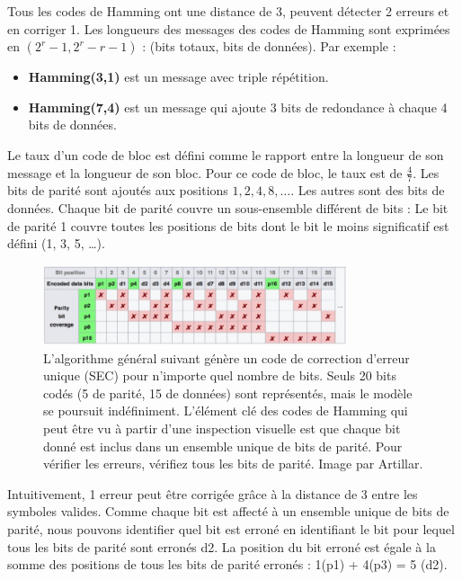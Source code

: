 Tous les codes de Hamming ont une distance de 3, peuvent détecter 2 erreurs et en corriger 1.  
Les longueurs des messages des codes de Hamming sont exprimées en $(2^r -1 , 2^r - r - 1)$ : (bits totaux, bits de données). Par exemple :
\begin{itemize}
    \item \textbf{Hamming(3,1)} est un message avec triple répétition.
    \item \textbf{Hamming(7,4)} est un message qui ajoute 3 bits de redondance à chaque 4 bits de données.
\end{itemize}
Le taux d'un code de bloc est défini comme le rapport entre la longueur de son message et la longueur de son bloc.  
Pour ce code de bloc, le taux est de $ \frac{4}{7} $.
Les bits de parité sont ajoutés aux positions $ 1, 2, 4, 8, \dots $. Les autres sont des bits de données.  
Chaque bit de parité couvre un sous-ensemble différent de bits :  
Le bit de parité 1 couvre toutes les positions de bits dont le bit le moins significatif est défini (1, 3, 5, …).
\begin{figure}[H] %
    \centering
    \includegraphics[width=0.8\textwidth]{figures/6-27.jpg}
    \caption{L'algorithme général suivant génère un code de correction d'erreur unique (SEC) pour n'importe quel nombre de bits. Seuls 20 bits codés (5 de parité, 15 de données) sont représentés, mais le modèle se poursuit indéfiniment. L'élément clé des codes de Hamming qui peut être vu à partir d'une inspection visuelle est que chaque bit donné est inclus dans un ensemble unique de bits de parité. Pour vérifier les erreurs, vérifiez tous les bits de parité. Image par Artillar. }
    \label{fig:communication2}
\end{figure}
Intuitivement, 1 erreur peut être corrigée grâce à la distance de 3 entre les symboles valides. Comme chaque bit est affecté à un ensemble unique de bits de parité, nous pouvons identifier quel bit est erroné en identifiant le bit pour lequel tous les bits de parité sont erronés d2. La position du bit erroné est égale à la somme des positions de tous les bits de parité erronés : 1(p1) + 4(p3) = 5 (d2).
